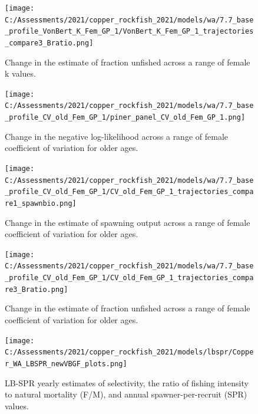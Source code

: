 \documentclass[11pt,
  english,
  a4paper,
]{article}
\begin{document}
\begin{figure}
\centering
\texttt{[image: C:/Assessments/2021/copper\_rockfish\_2021/models/wa/7.7\_base\_profile\_VonBert\_K\_Fem\_GP\_1/VonBert\_K\_Fem\_GP\_1\_trajectories\_compare3\_Bratio.png]}
\caption{Change in the estimate of fraction unfished across a range of female k values.\label{fig:k-depl}}
\end{figure}

\tagmcend\tagstructend


\begin{figure}
\centering
\texttt{[image: C:/Assessments/2021/copper\_rockfish\_2021/models/wa/7.7\_base\_profile\_CV\_old\_Fem\_GP\_1/piner\_panel\_CV\_old\_Fem\_GP\_1.png]}
\caption{Change in the negative log-likelihood across a range of female coefficient of variation for older ages.\label{fig:cv-profile}}
\end{figure}

\tagmcend\tagstructend


\begin{figure}
\centering
\texttt{[image: C:/Assessments/2021/copper\_rockfish\_2021/models/wa/7.7\_base\_profile\_CV\_old\_Fem\_GP\_1/CV\_old\_Fem\_GP\_1\_trajectories\_compare1\_spawnbio.png]}
\caption{Change in the estimate of spawning output across a range of female coefficient of variation for older ages.\label{fig:cv-ssb}}
\end{figure}

\tagmcend\tagstructend


\begin{figure}
\centering
\texttt{[image: C:/Assessments/2021/copper\_rockfish\_2021/models/wa/7.7\_base\_profile\_CV\_old\_Fem\_GP\_1/CV\_old\_Fem\_GP\_1\_trajectories\_compare3\_Bratio.png]}
\caption{Change in the estimate of fraction unfished across a range of female coefficient of variation for older ages.\label{fig:cv-depl}}
\end{figure}

\tagmcend\tagstructend

\newpage


\begin{figure}
\centering
\texttt{[image: C:/Assessments/2021/copper\_rockfish\_2021/models/lbspr/Copper\_WA\_LBSPR\_newVBGF\_plots.png]}
\caption{LB-SPR yearly estimates of selectivity, the ratio of fishing intensity to natural mortality (F/M), and annual spawner-per-recruit (SPR) values.\label{fig:lbspr}}
\end{figure}
\end{document}
